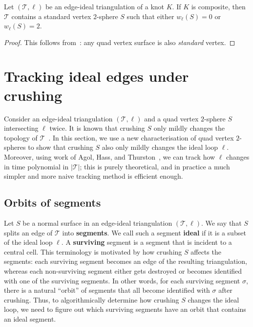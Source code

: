 \documentclass[a4paper,UKenglish,cleveref, autoref, thm-restate]{lipics-v2021}
\newcommand{\tri}{\mathcal{T}}
\begin{document}
\begin{corollary}
Let $(\tri,\ell)$ be an edge-ideal triangulation of a knot $K$.
If $K$ is composite, then $\tri$ contains a standard vertex $2$-sphere $S$ such that either $w_\ell(S)=0$ or $w_\ell(S)=2$.
\end{corollary}

\begin{proof}
This follows from~\cite[Lemma 4.5]{Burton09Converting}:
any quad vertex surface is also \emph{standard} vertex.
\end{proof}

\section{Tracking ideal edges under crushing}\label{sec:identifyingIdealEdges}

Consider an edge-ideal triangulation $(\tri,\ell)$ and a quad vertex $2$-sphere $S$ intersecting $\ell$ twice.
It is known that crushing $S$ only mildly changes the topology of $\tri$~\cite{burton2014crushing}.
In this section, we use a new characterisation of quad vertex $2$-spheres to show that crushing $S$ also only mildly changes the ideal loop $\ell$.
Moreover, using work of Agol, Hass, and Thurston~\cite[Sections 4 and 6]{agol2006computational}, we can track how $\ell$ changes in time polynomial in $|\tri|$;
this is purely theoretical, and in practice a much simpler and more naive tracking method is efficient enough.

\subsection{Orbits of segments}\label{ssec:orbitSegment}

Let $S$ be a normal surface in an edge-ideal triangulation $(\tri,\ell)$.
We say that $S$ splits an edge of $\tri$ into {\bf segments}.
We call such a segment \textbf{ideal} if it is a subset of the ideal loop $\ell$.
A \textbf{surviving} segment is a segment that is incident to a central cell.
This terminology is motivated by how crushing $S$ affects the segments:
each surviving segment becomes an edge of the resulting triangulation, whereas each non-surviving segment either gets destroyed or becomes identified with one of the surviving segments.
In other words, for each surviving segment $\sigma$, there is a natural ``orbit'' of segments that all become identified with $\sigma$ after crushing.
Thus, to algorithmically determine how crushing $S$ changes the ideal loop, we need to figure out which surviving segments have an orbit that contains an ideal segment.
\end{document}
